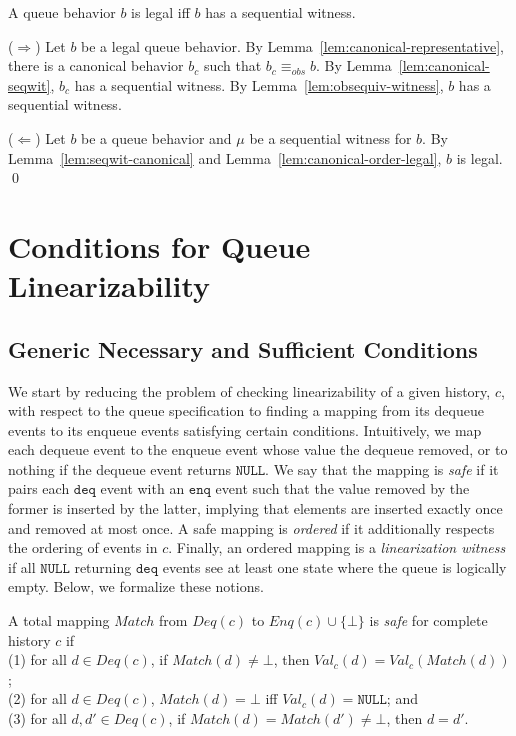 \documentclass{LMCS}
\newcommand{\NULL}{\ensuremath{\mathtt{NULL}}}
\newcommand{\enq}{\ensuremath{\mathtt{enq}}}
\newcommand{\deq}{\ensuremath{\mathtt{deq}}}
\newcommand{\Match}{\ensuremath{\mathit{Match}}}
\newcommand{\Deq}[1]{\ensuremath{\mathit{Deq}({#1})}}
\newcommand{\Enq}[1]{\ensuremath{\mathit{Enq}({#1})}}
\newcommand{\Val}[2]{\ensuremath{\mathit{Val}_{#1}({#2})}}
\newcommand{\obsequiv}{\ensuremath{\equiv_{\mathit{obs}}}}
\newcommand\mylabel[1]{\label{#1}}
\begin{document}
\begin{thm}\mylabel{thm:equiv-legal-seqwitness}
A queue behavior $b$ is legal iff $b$ has a sequential witness.
\end{thm}

\proof
($\Rightarrow$)
Let $b$ be a legal queue behavior.
By Lemma~\ref{lem:canonical-representative}, there is a canonical behavior $b_c$ such that $b_c\obsequiv b$.
By Lemma~\ref{lem:canonical-seqwit}, $b_c$ has a sequential witness.
By Lemma~\ref{lem:obsequiv-witness}, $b$ has a sequential witness.

($\Leftarrow$)
Let $b$ be a queue behavior and $\mu$ be a sequential witness for $b$.
By Lemma~\ref{lem:seqwit-canonical} and Lemma~\ref{lem:canonical-order-legal}, $b$ is legal.
\qed

\section{Conditions for Queue Linearizability}
\label{sec:conditions}


\subsection*{Generic Necessary and Sufficient Conditions}

We start by reducing the problem of checking linearizability of a given history, $c$, with respect to the queue specification to finding a mapping from its dequeue events to its enqueue events satisfying certain conditions.
Intuitively, we map each dequeue event to the enqueue event whose value the dequeue removed, or to nothing if the dequeue event returns \NULL.
We say that the mapping is {\em safe} if it pairs each {\deq} event with an {\enq} event such that the value removed by the former is inserted by the latter, 
implying that elements are inserted exactly once and removed at most once.
A safe mapping is {\em ordered} if it additionally respects the ordering of events in $c$.
Finally, an ordered mapping is a {\em linearization witness} if all {\NULL} returning {\deq} events see at least one state where the queue is logically empty.
Below, we formalize these notions.

\begin{defi}\mylabel{def:safe}
A total mapping $\Match$ from $\Deq c$ to $\Enq c\cup\{\bot\}$ is {\em safe} for complete history $c$ if \\
(1) for all $d\in \Deq c$, if $\Match(d)\neq\bot$, then $\Val c d =\Val c {\Match(d)}$;\\
(2) for all $d\in \Deq c$, $\Match(d)=\bot$ iff $\Val c d=\NULL$; and\\
(3) for all $d, d'\in \Deq c$, if $\Match(d)=\Match(d')\neq\bot$, then $d=d'$. 
\end{defi}
\end{document}
